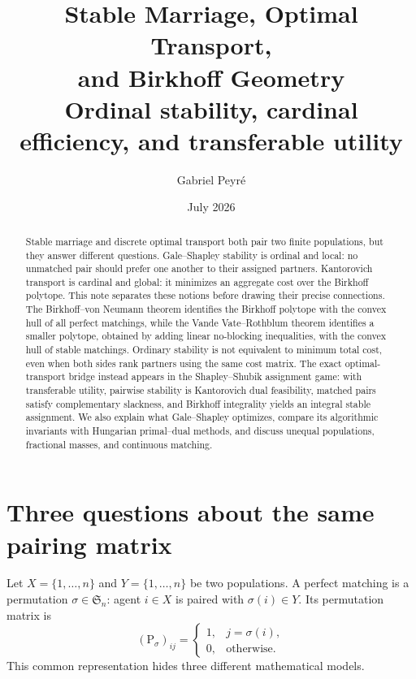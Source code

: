 \documentclass[11pt]{article}
\title{\textbf{Stable Marriage, Optimal Transport,\\
and Birkhoff Geometry}\\
\large Ordinal stability, cardinal efficiency, and transferable utility}
\author{Gabriel Peyr\'e}
\date{July 2026}
\theoremstyle{definition}
\theoremstyle{remark}
\newcommand{\Perm}{\mathfrak S}
\newcommand{\Pmat}{\mathrm P}
\begin{document}
\maketitle

\begin{abstract}
Stable marriage and discrete optimal transport both pair two finite populations,
but they answer different questions. Gale--Shapley stability is ordinal and
local: no unmatched pair should prefer one another to their assigned partners.
Kantorovich transport is cardinal and global: it minimizes an aggregate cost
over the Birkhoff polytope. This note separates these notions before drawing
their precise connections. The Birkhoff--von Neumann theorem identifies the
Birkhoff polytope with the convex hull of all perfect matchings, while the
Vande Vate--Rothblum theorem identifies a smaller polytope, obtained by adding
linear no-blocking inequalities, with the convex hull of stable matchings.
Ordinary stability is not equivalent to minimum total cost, even when both
sides rank partners using the same cost matrix. The exact optimal-transport
bridge instead appears in the Shapley--Shubik assignment game: with
transferable utility, pairwise stability is Kantorovich dual feasibility,
matched pairs satisfy complementary slackness, and Birkhoff integrality yields
an integral stable assignment. We also explain what Gale--Shapley optimizes,
compare its algorithmic invariants with Hungarian primal--dual methods, and
discuss unequal populations, fractional masses, and continuous matching.
\end{abstract}

\section{Three questions about the same pairing matrix}
\label{sec:three-questions}

Let $X=\{1,\ldots,n\}$ and $Y=\{1,\ldots,n\}$ be two populations. A
perfect matching is a permutation $\sigma\in\Perm_n$: agent $i\in X$ is
paired with \(\sigma(i)\in Y\). Its permutation matrix is
\begin{equation}\label{eq:permutation-matrix}
  (\Pmat_\sigma)_{ij}=\begin{cases}1,&j=\sigma(i),\\0,&\text{otherwise}.
  \end{cases}
\end{equation}
This common representation hides three different mathematical models.
\end{document}
